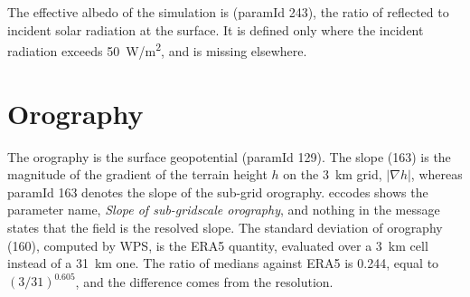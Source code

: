 The effective albedo of the simulation is  (paramId 243), the ratio of reflected to
incident solar radiation at the surface. It is defined only where the incident radiation exceeds
\SI{50}{W/m^2}, and is missing elsewhere.

\section{Orography}
\label{sec:orografia}

The orography is the surface geopotential  (paramId 129). The slope  (163) is
the magnitude of the gradient of the terrain height $h$ on the \SI{3}{km} grid, $|\nabla h|$, whereas
paramId 163 denotes the slope of the sub-grid orography. eccodes shows the parameter name,
\emph{Slope of sub-gridscale orography}, and nothing in the message states that the field is the
resolved slope. The standard deviation of orography  (160), computed by WPS, is the
ERA5 quantity, evaluated over a \SI{3}{km} cell instead of a \SI{31}{km} one. The ratio of medians
against ERA5 is \num{0.244}, equal to $(3/31)^{0.605}$, and the difference comes from the
resolution.
